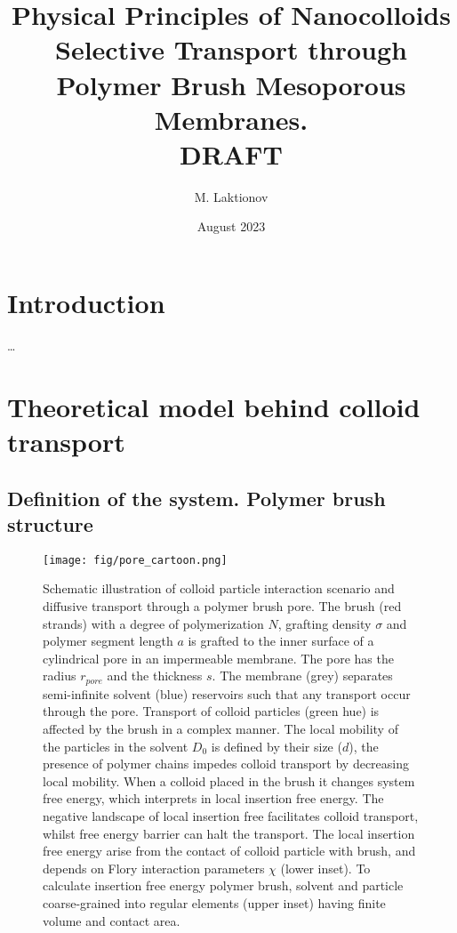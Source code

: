 \documentclass[12pt, a4paper]{article}
\title{Physical Principles of Nanocolloids Selective Transport through Polymer Brush Mesoporous Membranes. \\ DRAFT}
\author{M. Laktionov}
\date{August 2023}
\begin{document}
\maketitle

\section{Introduction}
\dots

\section{Theoretical model behind colloid transport}
\subsection{Definition of the system. Polymer brush structure}

\begin{figure}
    \centering
    \texttt{[image: fig/pore\_cartoon.png]}
    \caption{
        Schematic illustration of colloid particle interaction scenario and diffusive transport through a polymer brush pore. 
        The brush (red strands) with a degree of polymerization $N$, grafting density $\sigma$ and polymer segment length $a$ is grafted to the inner surface of a cylindrical pore in an impermeable membrane. The pore has the radius $r_{pore}$ and the thickness $s$.
        The membrane (grey) separates semi-infinite solvent (blue) reservoirs such that any transport occur through the pore. 
        Transport of colloid particles (green hue) is affected by the brush in a complex manner.
        The local mobility of the particles in the solvent $D_{0}$ is defined by their size ($d$), the presence of polymer chains impedes colloid transport by decreasing local mobility.
        When a colloid placed in the brush it changes system free energy, which interprets in local insertion free energy.
        The negative landscape of local insertion free facilitates colloid transport, whilst free energy barrier can halt the transport.
        The local insertion free energy arise from the contact of colloid particle with brush, and depends on Flory interaction parameters $\chi$ (lower inset). To calculate insertion free energy polymer brush, solvent and particle coarse-grained into regular elements (upper inset) having finite volume and contact area.
    }
    \label{fig:colloid_transport}
\end{figure}
\end{document}
